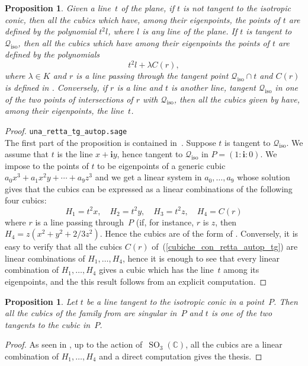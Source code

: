 \documentclass{amsart}
\theoremstyle{plain}
\newtheorem{prop}[lemma]{Proposition}
\theoremstyle{definition}
\newcommand{\C}{\mathbb{C}}
\newcommand{\iso}{\mathcal{Q}_{\mathrm{iso}}}
\newcommand{\SO}{\operatorname{SO}}
\newcommand{\iii}{\textbf{i}}
\begin{document}
\begin{prop}
\label{prop:eigenline_non_tangent}
Given a line~$t$ of the plane, if $t$ is not tangent to the isotropic
conic, then all the cubics which have, among their
eigenpoints, the points of $t$ are defined by the polynomial $t^2l$,
where $l$ is any line of the plane. If $t$ is tangent to $\iso$, then
all the cubics which have among their eigenpoints the points of $t$ are
defined by the polynomials
\begin{equation}
\label{cubiche_con_retta_autop_tg}
t^2l+\lambda C(r),
\end{equation}
where $\lambda \in K$ and $r$ is a line
passing through the tangent point $\iso\cap t$ and $C(r)$ is defined
in . Conversely, if $r$ is a line and
$t$ is another line, tangent $\iso$ in one of the two points of intersections
of $r$ with $\iso$, then all the cubics given
by  have, among their eigenpoints,
the line~$t$.
\end{prop}
\begin{proof}
\verb+una_retta_tg_autop.sage+\\
The first part of the proposition is contained in~.
Suppose $t$ is tangent to $\iso$. We assume that $t$ is the line
$x+\iii y$, hence tangent to $\iso$ in $P = (1: \iii: 0)$.
We impose to the points
of $t$ to be eigenpoints of a generic cubic $a_0x^3+a_1x^2y+\cdots+a_9z^3$
and we get a linear system in $a_0, \dots, a_9$ whose solution gives that
the cubics can be expressed as a linear combinations of the following
four cubics:
%
\[
H_1 = t^2x, \quad H_2 = t^2y, \quad H_3 = t^2z, \quad H_4 = C(r)
\]
%
where $r$ is a line passing through~$P$ (if, for instance, $r$
is $z$, then $H_4 = z(x^2 + y^2 + 2/3z^2)$. Hence the cubics are of the
form of . Conversely, it is easy to verify
that all the cubics $C(r)$ of~(\ref{cubiche_con_retta_autop_tg}) are
linear combinations of $H_1, \dots, H_4$, hence it is enough
to see that every linear combination of $H_1, \dots, H_4$ gives a
cubic which has the line~$t$ among its eigenpoints, and the this result
follows from an explicit computation.
\end{proof}

\begin{prop}
Let $t$ be a line tangent to the isotropic conic in a point~$P$. 
Then all the cubics of the family from  are singular in~$P$ and $t$ is one of the two tangents to the cubic in~$P$.
\end{prop}
\begin{proof}
As seen in , up to the action of~$\SO_3(\C)$, all the
cubics are a linear combination of $H_1, \dots, H_4$ and a direct
computation gives the thesis.
\end{proof}
\end{document}
